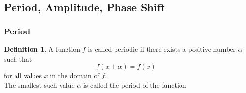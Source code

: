 \documentclass[11pt,a4paper]{article}
\theoremstyle{definition}
\newtheorem{definition}[thm]{Definition}
\begin{document}
\subsection{Period, Amplitude, Phase Shift}


\subsubsection{Period}

\begin{definition}

A function $f$ is called periodic if there exists a positive number $\alpha$ such that $$f(x + \alpha) = f(x)$$ for all values $x$ in the domain of $f$.\\
The smallest such value $\alpha$ is called the period of the function
\end{definition}
\end{document}
